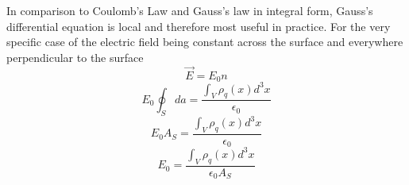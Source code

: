 \documentclass[12pt]{article}
\begin{document}
    \newline In comparison to Coulomb's Law and Gauss's law in integral form, Gauss's differential equation is local and therefore most useful in practice. 
    \newline For the very specific case of the electric field being constant across the surface and everywhere perpendicular to the surface
    \begin{equation}
        \vec{E} = E_0 n
    \end{equation}
    \begin{equation}
        E_0 \oint_S da = \frac{\int_V \rho_q(x) d^3 x}{\epsilon_0}
    \end{equation}
    \begin{equation}
        E_0 A_S = \frac{\int_V \rho_q(x) d^3 x}{\epsilon_0}
    \end{equation}
    \begin{equation}
        E_0= \frac{\int_V \rho_q(x) d^3 x}{\epsilon_0 A_S}
    \end{equation}
\end{document}
